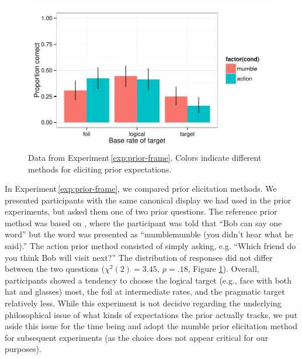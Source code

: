 \documentclass[man,noapacite]{apa2}
\newcounter{Experiment}
\newcommand{\exptref}[1]{Experiment\,\ref{#1}}
\begin{document}
\begin{figure}[t]
  \centering
  \includegraphics[width=5in]{../plots/2-prior-frame.pdf}
  \caption{\label{fig:prior-frame} Data from \exptref{exp:prior-frame}. Colors indicate different methods for eliciting prior expectations.}
\end{figure}

In \exptref{exp:prior-frame}, we compared prior elicitation methods. We presented participants with the same canonical display we had used in the prior experiments, but asked them one of two prior questions. The reference prior method was based on , where the participant was told that ``Bob can say one word'' but the word was presented as ``mumblemumble (you didn't hear what he said).'' The action prior method consisted of simply asking, e.g. ``Which friend do you think Bob will visit next?'' The distribution of responses did not differ between the two questions ($\chi^2(2) = 3.45,~p = .18$, Figure \ref{fig:prior-frame}). Overall, participants showed a tendency to choose the logical target (e.g., face with both hat and glasses) most, the foil at intermediate rates, and the pragmatic target relatively less. While this experiment is not decisive regarding the underlying philosophical issue of what kinds of expectations the prior actually tracks, we put aside this issue for the time being and adopt the mumble prior elicitation method for subsequent experiments (as the choice does not appear critical for our purposes).
\end{document}
